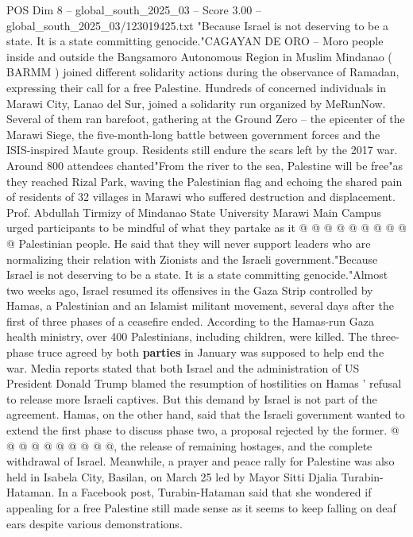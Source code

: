 \begin{textsample}{POS Dim 8 – global\_south\_2025\_03 – Score 3.00 – global\_south\_2025\_03/123019425.txt}  \label{ex:f8_pos_383}
"Because Israel is not deserving to be a state.
It is a state committing genocide."CAGAYAN DE ORO -- Moro people inside and outside the Bangsamoro Autonomous Region in Muslim Mindanao ( BARMM ) joined different solidarity actions during the observance of Ramadan, expressing their call for a free Palestine.
Hundreds of concerned individuals in Marawi City, Lanao del Sur, joined a solidarity run organized by MeRunNow.
Several of them ran barefoot, gathering at the Ground Zero -- the epicenter of the Marawi Siege, the five-month-long battle between government forces and the ISIS-inspired Maute group.
Residents still endure the scars left by the 2017 war.
Around 800 attendees chanted"From the river to the sea, Palestine will be free"as they reached Rizal Park, waving the Palestinian flag and echoing the shared pain of residents of 32 villages in Marawi who suffered destruction and displacement.
Prof.
Abdullah Tirmizy of Mindanao State University Marawi Main Campus urged participants to be mindful of what they partake as it @ @ @ @ @ @ @ @ @ @ Palestinian people.
He said that they will never support leaders who are normalizing their relation with Zionists and the Israeli government."Because Israel is not deserving to be a state.
It is a state committing genocide."Almost two weeks ago, Israel resumed its offensives in the Gaza Strip controlled by Hamas, a Palestinian and an Islamist militant movement, several days after the first of three phases of a ceasefire ended.
According to the Hamas-run Gaza health ministry, over 400 Palestinians, including children, were killed.
The three-phase truce agreed by both \textbf{parties} in January was supposed to help end the war.
Media reports stated that both Israel and the administration of US President Donald Trump blamed the resumption of hostilities on Hamas ' refusal to release more Israeli captives.
But this demand by Israel is not part of the agreement.
Hamas, on the other hand, said that the Israeli government wanted to extend the first phase to discuss phase two, a proposal rejected by the former. @ @ @ @ @ @ @ @ @ @, the release of remaining hostages, and the complete withdrawal of Israel.
Meanwhile, a prayer and peace rally for Palestine was also held in Isabela City, Basilan, on March 25 led by Mayor Sitti Djalia Turabin-Hataman.
In a Facebook post, Turabin-Hataman said that she wondered if appealing for a free Palestine still made sense as it seems to keep falling on deaf ears despite various demonstrations.

\end{textsample}
